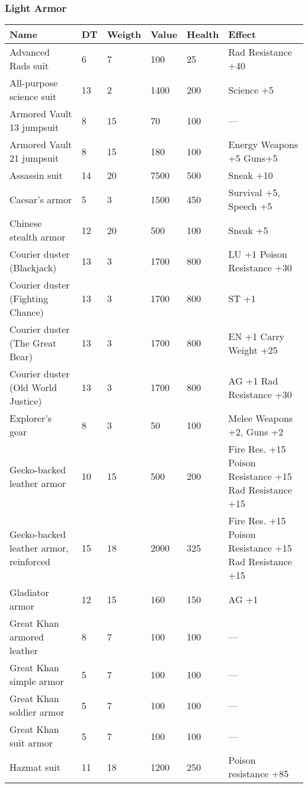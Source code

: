 
\subsubsection{Light Armor}
\begin{longtable}{|p{5cm}|p{0.9cm}|p{1.2cm}|p{1.2cm}|p{1.2cm}|p{5.5cm}|}
\hline
\bfseries Name & \bfseries DT & \bfseries Weigth & \bfseries Value & \bfseries Health & \bfseries Effect \\
\hline
\endhead
Advanced Rads suit & 6 & 7 & 100 & 25 & Rad Resistance +40 \\
All-purpose science suit & 13 & 2 & 1400 & 200 & Science +5 \\
Armored Vault 13 jumpsuit & 8 & 15 & 70 & 100 & — \\
Armored Vault 21 jumpsuit & 8 & 15 & 180 & 100 & Energy Weapons +5 Guns+5 \\
Assassin suit & 14 & 20 & 7500 & 500 & Sneak +10 \\
Caesar's armor & 5 & 3 & 1500 & 450 & Survival +5, Speech +5 \\
Chinese stealth armor & 12 & 20 & 500 & 100 & Sneak +5 \\
Courier duster (Blackjack) & 13 & 3 & 1700 & 800 & LU +1 Poison Resistance +30 \\
Courier duster (Fighting Chance) & 13 & 3 & 1700 & 800 & ST +1 \\
Courier duster (The Great Bear) & 13 & 3 & 1700 & 800 & EN +1 Carry Weight +25 \\
Courier duster (Old World Justice) & 13 & 3 & 1700 & 800 & AG +1 Rad Resistance +30 \\
Explorer's gear & 8 & 3 & 50 & 100 & Melee Weapons +2, Guns +2 \\
Gecko-backed leather armor & 10 & 15 & 500 & 200 & Fire Res. +15 Poison Resistance +15 Rad Resistance +15 \\
Gecko-backed leather armor, reinforced & 15 & 18 & 2000 & 325 & Fire Res. +15 Poison Resistance +15 Rad Resistance +15 \\
Gladiator armor & 12 & 15 & 160 & 150 & AG +1 \\
Great Khan armored leather & 8 & 7 & 100 & 100 & — \\
Great Khan simple armor & 5 & 7 & 100 & 100 & — \\
Great Khan soldier armor & 5 & 7 & 100 & 100 & — \\
Great Khan suit armor & 5 & 7 & 100 & 100 & — \\
Hazmat suit & 11 & 18 & 1200 & 250 & Poison resistance +85 \\

\end{longtable}
